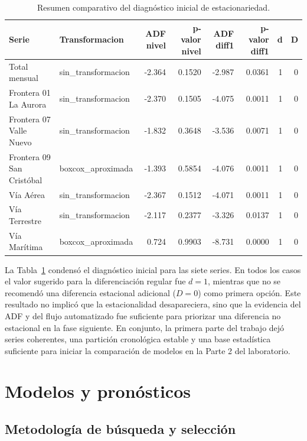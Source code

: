 \documentclass[12pt]{article}
\begin{document}
\begin{table}[H]
    \centering
    \scriptsize
    \caption{Resumen comparativo del diagnóstico inicial de estacionariedad.}
    \label{tab:estacionariedad}
    \begin{tabular}{llrrrrrr}
        \toprule
        Serie & Transformacion & ADF nivel & p-valor nivel & ADF diff1 & p-valor diff1 & d & D \\
        \midrule
        Total mensual & sin\_transformacion & -2.364 & 0.1520 & -2.987 & 0.0361 & 1 & 0 \\
        Frontera 01 La Aurora & sin\_transformacion & -2.370 & 0.1505 & -4.075 & 0.0011 & 1 & 0 \\
        Frontera 07 Valle Nuevo & sin\_transformacion & -1.832 & 0.3648 & -3.536 & 0.0071 & 1 & 0 \\
        Frontera 09 San Cristóbal & boxcox\_aproximada & -1.393 & 0.5854 & -4.076 & 0.0011 & 1 & 0 \\
        Vía Aérea & sin\_transformacion & -2.367 & 0.1512 & -4.071 & 0.0011 & 1 & 0 \\
        Vía Terrestre & sin\_transformacion & -2.117 & 0.2377 & -3.326 & 0.0137 & 1 & 0 \\
        Vía Marítima & boxcox\_aproximada & 0.724 & 0.9903 & -8.731 & 0.0000 & 1 & 0 \\
        \bottomrule
    \end{tabular}
\end{table}

La Tabla~\ref{tab:estacionariedad} condensó el diagnóstico inicial para las siete series. En todos los casos el valor sugerido para la diferenciación regular fue $d=1$, mientras que no se recomendó una diferencia estacional adicional ($D=0$) como primera opción. Este resultado no implicó que la estacionalidad desapareciera, sino que la evidencia del ADF y del flujo automatizado fue suficiente para priorizar una diferencia no estacional en la fase siguiente. En conjunto, la primera parte del trabajo dejó series coherentes, una partición cronológica estable y una base estadística suficiente para iniciar la comparación de modelos en la Parte 2 del laboratorio.

\section{Modelos y pronósticos}

\subsection{Metodología de búsqueda y selección}
\end{document}
